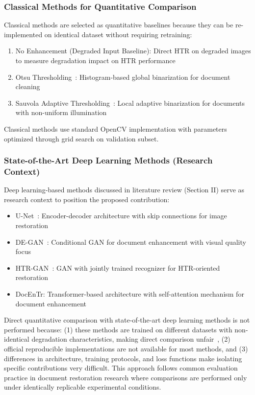\documentclass[journal]{IEEEtran}
\begin{document}
\subsubsection{Classical Methods for Quantitative Comparison}

Classical methods are selected as quantitative baselines because they can be re-implemented on identical dataset without requiring retraining:

\begin{enumerate}[label=(\alph*)]
    \item No Enhancement (Degraded Input Baseline): Direct HTR on degraded images to measure degradation impact on HTR performance
    \item Otsu Thresholding~\cite{otsu1979threshold}: Histogram-based global binarization for document cleaning
    \item Sauvola Adaptive Thresholding~\cite{sauvola2000adaptive}: Local adaptive binarization for documents with non-uniform illumination
\end{enumerate}

Classical methods use standard OpenCV implementation with parameters optimized through grid search on validation subset.

\subsubsection{State-of-the-Art Deep Learning Methods (Research Context)}

Deep learning-based methods discussed in literature review (Section II) serve as research context to position the proposed contribution:

\begin{itemize}
    \item U-Net~\cite{ronneberger2015unet}: Encoder-decoder architecture with skip connections for image restoration
    \item DE-GAN~\cite{souibgui2020degan}: Conditional GAN for document enhancement with visual quality focus
    \item HTR-GAN~\cite{souibgui2021enhance}: GAN with jointly trained recognizer for HTR-oriented restoration
    \item DocEnTr: Transformer-based architecture with self-attention mechanism for document enhancement
\end{itemize}

Direct quantitative comparison with state-of-the-art deep learning methods is not performed because: (1) these methods are trained on different datasets with non-identical degradation characteristics, making direct comparison unfair~\cite{tensmeyer2017document}, (2) official reproducible implementations are not available for most methods, and (3) differences in architecture, training protocols, and loss functions make isolating specific contributions very difficult. This approach follows common evaluation practice in document restoration research where comparisons are performed only under identically replicable experimental conditions.
\end{document}
